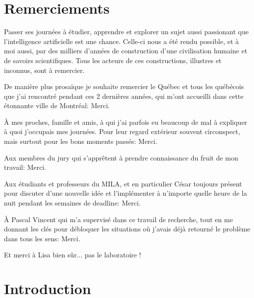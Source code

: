 \documentclass[12pt,maitrise,nobabel,anglais,twoside,initial]{template/dms}
\numberwithin{equation}{section}
\numberwithin{table}{chapter}
\numberwithin{figure}{chapter}
\begin{document}
\chapter*{Remerciements} %

Passer ses journées à étudier, apprendre et explorer un sujet aussi passionant que l'intelligence artificielle est une chance. Celle-ci nous a été rendu possible, et à moi aussi, par des milliers d'années de construction d'une civilisation humaine et de savoirs scientifiques. Tous les acteurs de ces constructions, illustres et inconnus, sont à remercier. 

De manière plus prosaïque je souhaite remercier le Québec et tous les québécois que j'ai rencontré pendant ces 2 dernières années, qui m'ont accueilli dans cette étonnante ville de Montréal: Merci. 

À mes proches, famille et amis, à qui j'ai parfois eu beaucoup de mal à expliquer à quoi j'occupais mes journées. Pour leur regard extérieur souvent circonspect, mais surtout pour les bons moments passés: Merci.

Aux membres du jury qui s'apprêtent à prendre connaissance du fruit de mon travail: Merci.

Aux étudiants et professeurs du MILA, et en particulier César toujours présent pour discuter d'une nouvelle idée et l'implémenter à n'importe quelle heure de la nuit pendant les semaines de deadline: Merci. 

À Pascal Vincent qui m'a supervisé dans ce travail de recherche, tout en me donnant les clés pour débloquer les situations où j'avais déjà retourné le problème dans tous les sens: Merci.

Et merci à Lisa bien sûr... pas le laboratoire !


\NoChapterPageNumber 
\cleardoublepage



\chapter*{Introduction}





\


\end{document}
